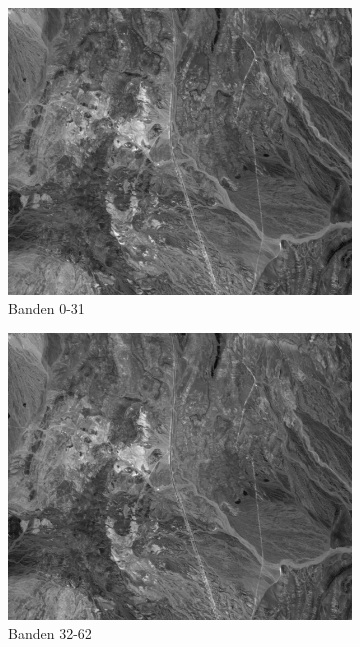 \newpage
\begin{figure}[H]
\centering
\begin{subfigure}{0.48\textwidth}
  \centering
  \includegraphics[width=0.95\linewidth]{images/cuprite_bands_0-32.png}
  \caption{Banden 0-31}
\end{subfigure}
\begin{subfigure}{0.48\textwidth}
  \centering
  \includegraphics[width=0.95\linewidth]{images/cuprite_bands_32-63.png}
  \caption{Banden 32-62}
\end{subfigure}
\\
\begin{subfigure}{0.48\textwidth}

\end{subfigure}
\end{figure}
